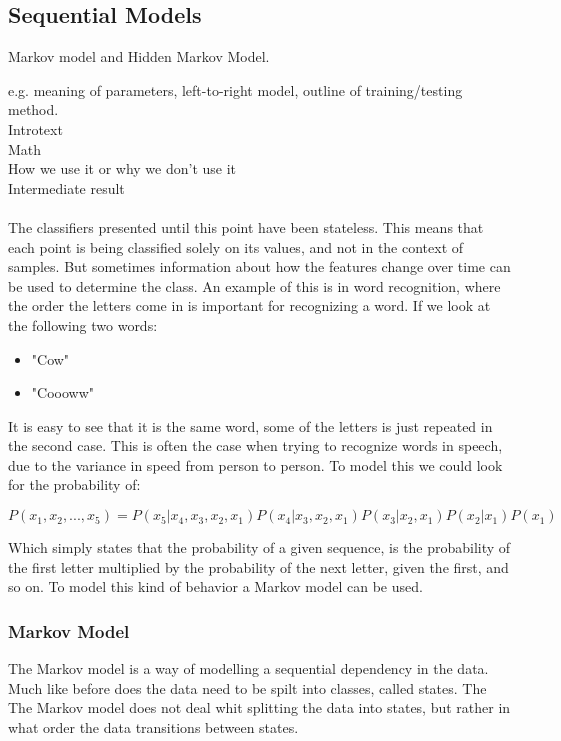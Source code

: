 \subsection{Sequential Models}
Markov model and Hidden Markov Model.

e.g. meaning of parameters, left-to-right model, outline of training/testing method.\\

Introtext\\

Math\\

How we use it or why we don't use it\\

Intermediate result\\\ \\


The classifiers presented until this point have been stateless. This means that each point is being classified solely on its values, and not in the context of samples. But sometimes information about how the features change over time can be used to determine the class. An example of this is in word recognition, where the order the letters come in is important for recognizing a word.  If we look at the following two words:

\begin{itemize}
  \item "Cow"
  \item "Coooww"
\end{itemize}

It is easy to see that it is the same word, some of the letters is just repeated in the second case. This is often the case when trying to recognize words in speech, due to the variance in speed from person to person. To model this we could look for the probability of: 

\begin{equation}
 P(x_1, x_2, ..., x_5) = P(x_5| x_4,x_3,x_2, x_1) P(x_4| x_3,x_2, x_1) P(x_3|x_2, x_1) P(x_2|x_1) P(x_1)
 \label{eq:seqmodel}
\end{equation}

Which simply states that the probability of a given sequence, is the probability of the first letter multiplied by the probability of the next letter, given the first, and so on. To model this kind of behavior a Markov model can be used.

\subsubsection{Markov Model}
The Markov model is a way of modelling a sequential dependency in the data. Much like before does the data need to be spilt into classes, called states. The The Markov model does not deal whit splitting the data into states, but rather in what order the data transitions between states.\\\ \\

